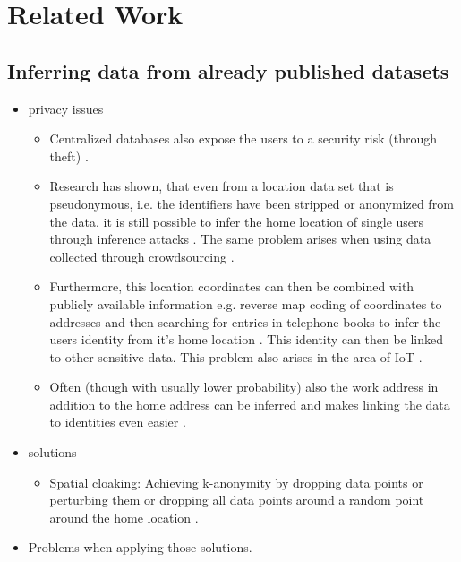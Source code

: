 \chapter{Related Work}\label{chapter:related-work}
\section{Inferring data from already published datasets}
\begin{itemize}
	\item privacy issues
	\begin{itemize}
		\item Centralized databases also expose the users to a security risk (through theft) \parencite{iot, hoh2006enhancing}.
		\item Research has shown, that even from a location data set that is pseudonymous, i.e. the identifiers have been stripped or anonymized from the data, it is still possible to infer the home location of single users through inference attacks \parencite{krumm, cellphone, privacy-home-work-pairs, hoh2006enhancing, twitter}. The same problem arises when using data collected through crowdsourcing \parencite{crowdsourcing}.
		\item Furthermore, this location coordinates can then be combined with publicly available information e.g. reverse map coding of coordinates to addresses and then searching for entries in telephone books to infer the users identity from it's home location \parencite{krumm, privacy-home-work-pairs, hoh2006enhancing}. This identity can then be linked to other sensitive data. This problem also arises in the area of IoT \parencite{iot, hoh2006enhancing}.
		\item Often (though with usually lower probability) also the work address in addition to the home address can be inferred and makes linking the data to identities even easier \parencite{cellphone, privacy-home-work-pairs}.
	\end{itemize}
	\item solutions
	\begin{itemize}
		\item Spatial cloaking: Achieving k-anonymity by dropping data points or perturbing them or dropping all data points around a random point around the home location \parencite{krumm}.
	\end{itemize}
	\item Problems when applying those solutions.

\end{itemize}
